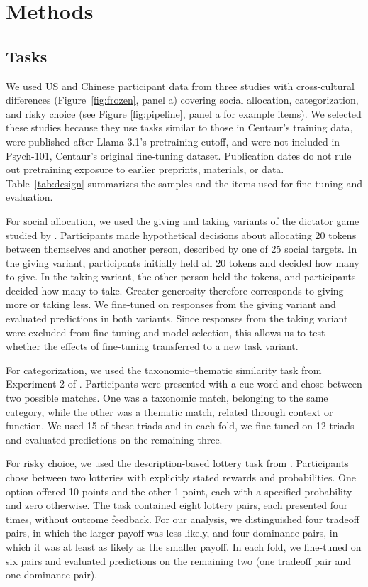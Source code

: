 
\section{Methods}
\label{sec:methods}


\subsection{Tasks}

We used US and Chinese participant data from three studies with cross-cultural differences (Figure~\ref{fig:frozen}, panel a) covering
social allocation, categorization, and risky choice (see Figure \ref{fig:pipeline}, panel a for example items). We selected these studies because they use tasks similar to those in Centaur’s training data, were published after Llama 3.1’s pretraining cutoff, and were not included in Psych-101, Centaur’s original fine-tuning dataset. Publication dates do not rule out pretraining exposure to earlier preprints, materials, or data. Table~\ref{tab:design} summarizes the samples and the items used
for fine-tuning and evaluation.

For social allocation, we used the giving and taking variants
of the dictator game studied by \citet{wang2026decomposing}.
Participants made hypothetical decisions about allocating
20 tokens between themselves and another person, described
by one of 25 social targets. In the giving variant, participants
initially held all 20 tokens and decided how many to give.
In the taking variant, the other person held the tokens,
and participants decided how many to take. Greater generosity
therefore corresponds to giving more or taking less.
We fine-tuned on responses from the giving variant and evaluated
predictions in both variants. Since responses from the taking variant
were excluded from fine-tuning and model selection, this allows
us to test whether the effects of fine-tuning transferred
to a new task variant.

For categorization, we used the taxonomic--thematic similarity
task from Experiment 2 of \citet{cao2024differences}. Participants
were presented with a cue word and chose between two possible
matches. One was a taxonomic match, belonging to the same
category, while the other was a thematic match, related through
context or function. We used 15 of these triads and in each fold, we fine-tuned
on 12 triads and evaluated predictions on the remaining three.

For risky choice, we used the description-based lottery task
from \citet{anllo2024preferences}. Participants chose between
two lotteries with explicitly stated rewards and
probabilities. One option offered 10 points and the other
1 point, each with a specified probability and zero otherwise.
The task contained eight lottery pairs, each presented four
times, without outcome feedback. For our analysis, we distinguished four tradeoff pairs, in
which the larger payoff was less likely, and four dominance
pairs, in which it was at least as likely as the smaller payoff.
In each fold, we fine-tuned on six pairs and evaluated
predictions on the remaining two (one tradeoff pair and one
dominance pair).

